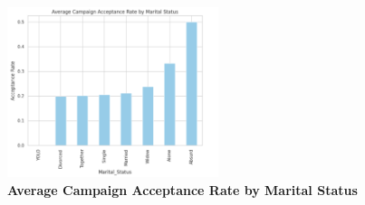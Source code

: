 \documentclass[a4paper]{article}
\begin{document}
\begin{figure}[h]
    \centering
    \includegraphics[width=0.55\textwidth]{Average Campaign Acceptance Rate by Marital Status.png}
    \caption{\textbf{Average Campaign Acceptance Rate by Marital Status}}

    \label{fig:sales}
\end{figure}
\end{document}
